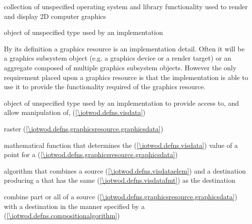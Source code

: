 %
collection of unspecified operating system and library functionality used to render and display 2D computer graphics

%
 object of unspecified type used by an implementation
\begin{note}
By its definition a graphics resource is an implementation detail. Often it will be a graphics subsystem object (e.g. a graphics device or a render target) or an aggregate composed of multiple graphics subsystem objects. However the only requirement placed upon a graphics resource is that the implementation is able to use it to provide the functionality required of the graphics resource.
\end{note}

%
%
 object of unspecified type used by an implementation to provide access to, and allow manipulation of,  (\ref{\iotwod.defns.visdata})

\indexdefn{\pixmap}%
raster  (\ref{\iotwod.defns.graphicsresource.graphicsdata})

%
mathematical function that determines the  (\ref{\iotwod.defns.visdata}) value of a point for a  (\ref{\iotwod.defns.graphicsresource.graphicsdata})

%
algorithm that combines a source  (\ref{\iotwod.defns.visdataelem}) and a destination  producing a  that has the same  (\ref{\iotwod.defns.visdatafmt}) as the destination 

%
combine part or all of a source  (\ref{\iotwod.defns.graphicsresource.graphicsdata}) with a destination  in the manner specified by a  (\ref{\iotwod.defns.compositionalgorithm})

